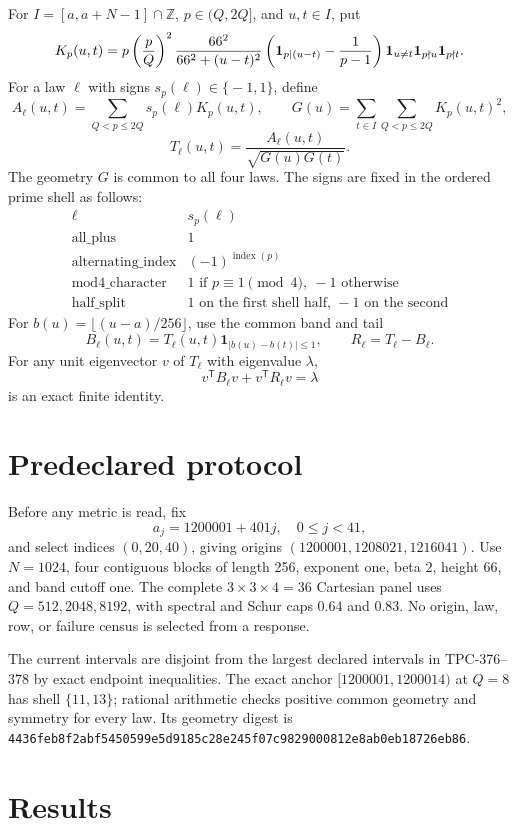 \documentclass[10pt]{article}
\begin{document}
For $I=[a,a+N-1]\cap\mathbb Z$, $p\in(Q,2Q]$, and $u,t\in I$, put
\[
 K_p(u,t)=p\left(\frac pQ\right)^2
 \frac{66^2}{66^2+(u-t)^2}
 \left({\bf1}_{p\mid(u-t)}-\frac1{p-1}\right)
 \mathbf{1}_{u\ne t}\mathbf{1}_{p\nmid u}\mathbf{1}_{p\nmid t}.
\]
For a law $\ell$ with signs $s_p(\ell)\in\{\!-1,1\}$, define
\[
 A_\ell(u,t)=\sum_{Q<p\leq2Q}s_p(\ell)K_p(u,t),\qquad
 G(u)=\sum_{t\in I}\sum_{Q<p\leq2Q}K_p(u,t)^2,
\]
\[
 T_\ell(u,t)=\frac{A_\ell(u,t)}{\sqrt{G(u)G(t)}}.
\]
The geometry $G$ is common to all four laws. The signs are fixed in the
ordered prime shell as follows:
\[
\begin{array}{c|l}
\ell&s_p(\ell)\\ \hline
\text{all\_plus}&1\\
\text{alternating\_index}&(-1)^{\operatorname{index}(p)}\\
\text{mod4\_character}&1\text{ if }p\equiv1\pmod4,\ -1\text{ otherwise}\\
\text{half\_split}&1\text{ on the first shell half, }-1\text{ on the second}
\end{array}
\]
For $b(u)=\lfloor(u-a)/256\rfloor$, use the common band and tail
\[
 B_\ell(u,t)=T_\ell(u,t)\mathbf{1}_{|b(u)-b(t)|\leq1},\qquad
 R_\ell=T_\ell-B_\ell.
\]
For any unit eigenvector $v$ of $T_\ell$ with eigenvalue $\lambda$,
\[
 v^{\mathsf T}B_\ell v+v^{\mathsf T}R_\ell v=\lambda
\]
is an exact finite identity.

\section{Predeclared protocol}

Before any metric is read, fix
\[
 a_j=1200001+401j,\quad 0\leq j<41,
\]
and select indices $(0,20,40)$, giving origins
$(1200001,1208021,1216041)$. Use $N=1024$, four contiguous blocks of
length 256, exponent one, beta $2$, height $66$, and band cutoff one.
The complete $3\times3\times4=36$ Cartesian panel uses
$Q=512,2048,8192$, with spectral and Schur caps $0.64$ and $0.83$.
No origin, law, row, or failure census is selected from a response.

The current intervals are disjoint from the largest declared intervals in
TPC-376--378 by exact endpoint inequalities. The exact anchor
$[1200001,1200014)$ at $Q=8$ has shell $\{11,13\}$; rational arithmetic
checks positive common geometry and symmetry for every law. Its geometry
digest is
\texttt{4436feb8f2abf5450599e5d9185c28e245f07c9829000812e8ab0eb18726eb86}.

\section{Results}
\end{document}
